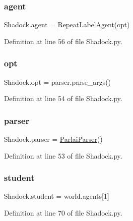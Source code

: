 \subsubsection{\texorpdfstring{agent}{agent}}
{\footnotesize\ttfamily Shadock.\+agent = \hyperlink{classShadock_1_1RepeatLabelAgent}{Repeat\+Label\+Agent}(\hyperlink{namespaceShadock_ac5de26058c2175bfdfb877050f0b208e}{opt})}



Definition at line 56 of file Shadock.\+py.

\mbox{\label{namespaceShadock_ac5de26058c2175bfdfb877050f0b208e}} 
\subsubsection{\texorpdfstring{opt}{opt}}
{\footnotesize\ttfamily Shadock.\+opt = parser.\+parse\+\_\+args()}



Definition at line 54 of file Shadock.\+py.

\mbox{\label{namespaceShadock_ac8bec66fd11468b8d014b78e0f076168}} 
\subsubsection{\texorpdfstring{parser}{parser}}
{\footnotesize\ttfamily Shadock.\+parser = \hyperlink{classparlai_1_1core_1_1params_1_1ParlaiParser}{Parlai\+Parser}()}



Definition at line 53 of file Shadock.\+py.

\mbox{\label{namespaceShadock_ab2d7d84abaa3abe19a6117bae9ac9712}} 
\subsubsection{\texorpdfstring{student}{student}}
{\footnotesize\ttfamily Shadock.\+student = world.\+agents\mbox{[}1\mbox{]}}



Definition at line 70 of file Shadock.\+py.

\mbox{\label{namespaceShadock_a21eede1a81cd93d5171e2c5989796836}} 
